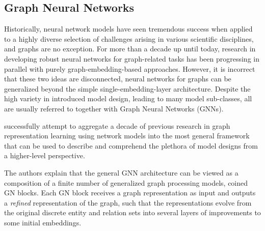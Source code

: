 \subsection{Graph Neural Networks}
Historically, neural network models have seen tremendous success when applied to a highly diverse selection of challenges arising in various scientific disciplines, and graphs are no exception. For more than a decade up until today, research in developing robust neural networks for graph-related tasks has been progressing in parallel with purely graph-embedding-based approaches. However, it is incorrect that these two ideas are disconnected, neural networks for graphs can be generalized beyond the simple single-embedding-layer architecture. Despite the high variety in introduced model design, leading to many model sub-classes, all are usually referred to together with Graph Neural Networks (GNNs).

\cite{battaglia_relational_2018} successfully attempt to aggregate a decade of previous research in graph representation learning using network models into the most general framework that can be used to describe and comprehend the plethora of model designs from a higher-level perspective. 

The authors explain that the general GNN architecture can be viewed as a composition of a finite number of generalized graph processing models, coined GN blocks. Each GN block receives a graph representation as input and outputs a \emph{refined} representation of the graph, such that the representations evolve from the original discrete entity and relation sets into several layers of improvements to some initial embeddings. 

